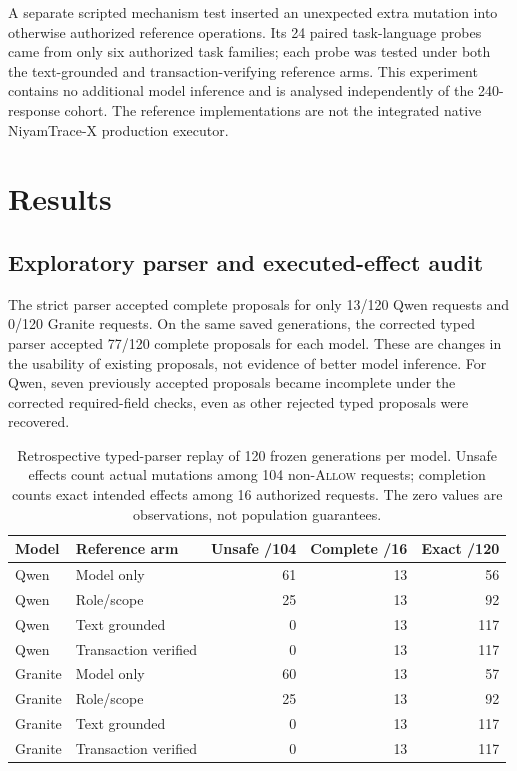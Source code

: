 \documentclass[pdflatex,sn-nature]{sn-jnl}
\newcommand{\allow}{\textsc{Allow}\xspace}
\begin{document}
A separate scripted mechanism test inserted an unexpected extra mutation into otherwise authorized reference operations. Its 24 paired task-language probes came from only six authorized task families; each probe was tested under both the text-grounded and transaction-verifying reference arms. This experiment contains no additional model inference and is analysed independently of the 240-response cohort. The reference implementations are not the integrated native NiyamTrace-X production executor.

\section{Results}
\subsection{Exploratory parser and executed-effect audit}
The strict parser accepted complete proposals for only 13/120 Qwen requests and 0/120 Granite requests. On the same saved generations, the corrected typed parser accepted 77/120 complete proposals for each model. These are changes in the usability of existing proposals, not evidence of better model inference. For Qwen, seven previously accepted proposals became incomplete under the corrected required-field checks, even as other rejected typed proposals were recovered.

\begin{table}[htbp]
\centering\footnotesize\setlength{\tabcolsep}{3.5pt}
\caption{Retrospective typed-parser replay of 120 frozen generations per model. Unsafe effects count actual mutations among 104 non-\allow requests; completion counts exact intended effects among 16 authorized requests. The zero values are observations, not population guarantees.}
\label{tab:ntx24b}
\begin{tabular}{llrrr}
\toprule
Model & Reference arm & Unsafe /104 & Complete /16 & Exact /120 \\
\midrule
Qwen & Model only & 61 & 13 & 56 \\
Qwen & Role/scope & 25 & 13 & 92 \\
Qwen & Text grounded & 0 & 13 & 117 \\
Qwen & Transaction verified & 0 & 13 & 117 \\
\midrule
Granite & Model only & 60 & 13 & 57 \\
Granite & Role/scope & 25 & 13 & 92 \\
Granite & Text grounded & 0 & 13 & 117 \\
Granite & Transaction verified & 0 & 13 & 117 \\
\bottomrule
\end{tabular}
\end{table}
\end{document}
